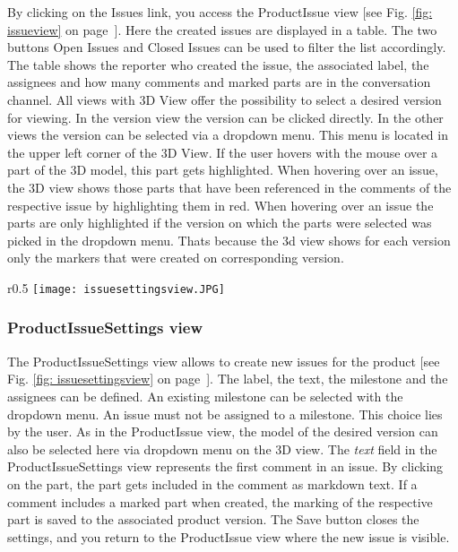 By clicking on the Issues link, you access the ProductIssue view [see Fig. \ref{fig: issueview} on page~\pageref{fig: issueview}]. Here the created issues are displayed in a table. The two buttons Open Issues and Closed Issues can be used to filter the list accordingly. The table shows the reporter who created the issue, the associated label, the assignees and how many comments and marked parts are in the conversation channel. 
All views with 3D View offer the possibility to select a desired version for viewing. In the version view the version can be clicked directly. In the other views the version can be selected via a dropdown menu. This menu is located in the upper left corner of the 3D View. 
If the user hovers with the mouse over a part of the 3D model, this part gets highlighted. 
When hovering over an issue, the 3D view shows those parts that have been referenced in the comments of the respective issue by highlighting them in red.
When hovering over an issue the parts are only highlighted if the version on which the parts were selected was picked in the dropdown menu. Thats because the 3d view shows for each version only the markers that were created on corresponding version.

\begin{wrapfigure}{r}{0.5\textwidth}
    \centering
    \texttt{[image: issuesettingsview.JPG]}
    \caption{Issuesettings view}
    \label{fig: issuesettingsview}
\end{wrapfigure}

\subsubsection*{ProductIssueSettings view}

The ProductIssueSettings view allows to create new issues for the product [see Fig. \ref{fig: issuesettingsview} on page~\pageref{fig: issuesettingsview}]. The label, the text, the milestone and the assignees can be defined. An existing milestone can be selected with the dropdown menu. An issue must not be assigned to a milestone. This choice lies by the user. 
As in the ProductIssue view, the model of the desired version can also be selected here via dropdown menu on the 3D view.
The \textit{text} field in the ProductIssueSettings view represents the first comment in an issue. By clicking on the part, the part gets included in the comment as markdown text. If a comment includes a marked part when created, the marking of the respective part is saved to the associated product version.
The Save button closes the settings, and you return to the ProductIssue view where the new issue is visible.

